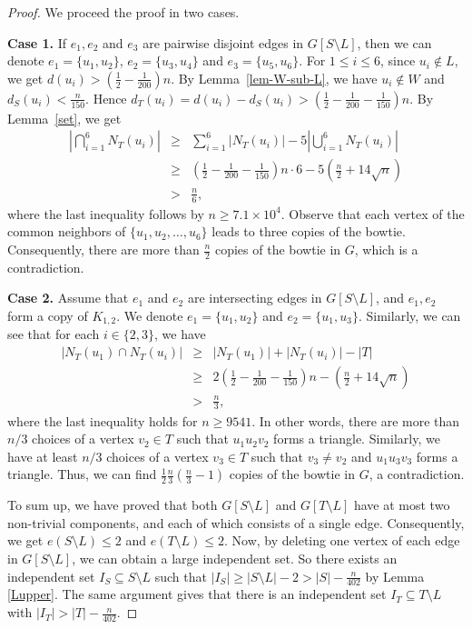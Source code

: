 \documentclass[11pt]{article}
\begin{document}
\begin{proof}
We proceed the proof in two cases. 

{\bf Case 1.}  
If $e_1,e_2$ and $e_3$ are pairwise disjoint edges in $G[S\setminus L]$, 
then we can denote 
$e_1=\{u_1,u_2\}$, $e_2=\{u_3,u_4\}$ 
and $e_3=\{u_5,u_6\}$. 
For $1\le i\le 6 $,   
since $u_i \notin L$, we get  
$d(u_i)> \left(\frac{1}{2}-\frac{1}{200} \right)n$.
By Lemma~\ref{lem-W-sub-L}, 
we have $u_i \notin W$ and 
$d_S(u_i)<  \frac{n}{150}$. Hence
$d_T(u_i)=d(u_i)-d_S(u_i)> \left(\frac{1}{2}-\frac{1}{200}-\frac{1}{150}\right)n.$
By Lemma~\ref{set}, we  get 
    \begin{eqnarray*}
\left |\bigcap_{i=1}^{6}N_T(u_i) \right| &\ge &  \sum_{i=1}^{6}|N_T(u_i)|-5 \left|\bigcup_{i=1}^{6}N_T(u_i) \right| \\
& \ge& \left (\frac{1}{2}-\frac{1}{200}-\frac{1}{150} \right)n\cdot 6 - 
5 \left(\frac{n}{2}+ 14 \sqrt{n} \right) \\
 &>& \frac{n}{6}, 
\end{eqnarray*}
where the last inequality follows by $n\ge 7.1\times 10^{4}$. 
Observe that 
each vertex of the common neighbors of 
$\{u_1,u_2,\ldots ,u_6\}$ leads to three copies of the bowtie. Consequently,  there are 
 more than $\frac{n}{2}$ copies of the bowtie in $G$, 
 which is a contradiction. 

{\bf Case 2.}  
Assume that $e_1$ and $e_2$ are intersecting edges in $G[S\setminus L]$,  
and $e_1,e_2$ form a copy of $K_{1,2}$. 
We denote 
$e_1=\{u_1,u_2\}$ and $e_2=\{u_1,u_3\}$. Similarly, we can see that 
for each $i \in \{2,3\}$, 
   we have
   \begin{eqnarray*}
 |N_T(u_1)\cap N_T(u_i)| 
 &\ge&  |N_T(u_1) | + |N_T(u_i)|  -|T| \\
& \ge & 
2 \left(\frac{1}{2}-\frac{1}{200} -\frac{1}{150} \right)n 
- \left( \frac{n}{2} +14\sqrt{n}\right)\\
 &>&\frac{n}{3}, 
\end{eqnarray*}
where the last inequality holds for $n\ge 9541$. 
In  other words, there are more than 
 $n/3$ choices of a vertex $v_2\in T$ 
such that $u_1u_2 v_2$ forms a triangle. 
Similarly, we have at least $n/3$ choices of a vertex 
$v_3\in T$ such that $v_3\neq v_2$ and 
$u_1u_3v_3$ forms a triangle. 
Thus, we can find $\frac{1}{2}\frac{n}{3} (\frac{n}{3}-1) $ copies of the bowtie in $G$, a contradiction. 
 
 To sum up, we have proved that 
both $G[S\setminus L]$ and $G[T\setminus L]$ 
have at most two non-trivial components, and each of which consists of a single edge. 
Consequently, we get $e(S\setminus L)\le 2$ and $e(T\setminus L)\le 2$. 
Now, by deleting  
 one vertex of each edge in $G[S\setminus L]$, we can obtain 
 a large independent set. 
 So there exists an independent set
 $I_S\subseteq S\setminus L$ such that
  $
  |I_S|\ge |S\setminus L| - 2 
  > |S| - \frac{n}{402}$ by Lemma \ref{Lupper}. 
 The same argument gives that there  is an independent set $I_T\subseteq T\setminus L$ with
$ |I_T|> |T|- \frac{n}{402}$.  
 \end{proof}
\end{document}
